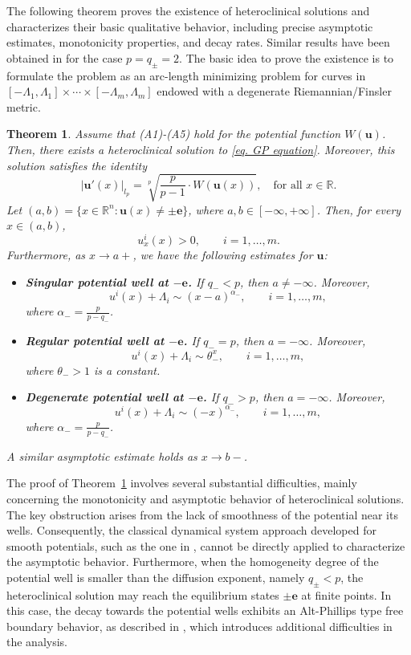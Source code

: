 \documentclass[11pt,twoside,reqno]{amsart}
\newtheorem{theorem}{Theorem}[section]
\numberwithin{equation}{section}
\begin{document}
The following theorem proves the existence of heteroclinical solutions and characterizes their basic qualitative behavior, including precise asymptotic estimates, monotonicity properties, and decay rates. Similar results have been obtained in \cite{AFN21,AftalionSourdis2019} for the case  $p=q_{\pm}=2$. The basic idea to prove the existence is to formulate the problem as an arc-length minimizing problem for curves in $[-\Lambda_{1},\Lambda_{1}]\times\cdots\times[-\Lambda_{m},\Lambda_{m}]$ endowed with a degenerate Riemannian/Finsler metric.
\begin{theorem}\label{thm. basic}
    Assume that (A1)-(A5) hold for the potential function $W(\mathbf{u})$. Then, there exists a heteroclinical solution to \eqref{eq. GP equation}. Moreover, this solution satisfies the identity
    \begin{equation}\label{eq. speed identity}
        |\mathbf{u}'(x)|_{l_{p}}=\sqrt[p]{\frac{p}{p-1}\cdot W(\mathbf{u}(x))},\quad\mbox{for all } x\in\mathbb{R}.
    \end{equation}
    Let $(a,b)=\{x\in\mathbb{R}^{n}:\mathbf{u}(x)\neq\pm\mathbf{e}\}$, where $a,b\in[-\infty,+\infty]$. 
    Then, for every $x\in(a,b)$,
    \[
    u_x^i(x)>0,\qquad i=1,\dots,m.
    \]
    Furthermore, as $x\to a+$, we have the following estimates for $\mathbf{u}$:
 \begin{itemize}
        \item \textbf{Singular potential well at $-\mathbf{e}$.}
        If $q_{-}<p$, then $a\neq-\infty$. Moreover,
        \[
        u^{i}(x)+\Lambda_i\sim (x-a)^{\alpha_-},\qquad i=1,\dots,m,
        \]
        where $\alpha_-=\frac{p}{p-q_-}$.
        \item \textbf{Regular potential well at $-\mathbf{e}$.}
        If $q_-=p$, then $a=-\infty$. Moreover,
        \[
        u^{i}(x)+\Lambda_i\sim \theta_-^{x},\qquad i=1,\dots,m,
        \]
        where $\theta_->1$ is a constant.
        \item \textbf{Degenerate potential well at $-\mathbf{e}$.}
        If $q_->p$, then $a=-\infty$. Moreover,
        \[
        u^{i}(x)+\Lambda_i\sim (-x)^{\alpha_-},\qquad i=1,\dots,m,
        \]
        where $\alpha_-=\frac{p}{p-q_-}$.
    \end{itemize}
    A similar asymptotic estimate holds as $x\to b-$.
\end{theorem}

The proof of Theorem~\ref{thm. basic} involves several substantial difficulties, mainly concerning the monotonicity and asymptotic behavior of heteroclinical solutions. The key obstruction arises from the lack of smoothness of the potential near its wells. Consequently, the classical dynamical system approach developed for smooth potentials, such as the one in \cite{AFN21}, cannot be directly applied to characterize the asymptotic behavior. Furthermore, when the homogeneity degree of the potential well is smaller than the diffusion exponent, namely $q_{\pm}<p$, the heteroclinical solution may reach the equilibrium states $\pm\mathbf{e}$ at finite points. In this case, the decay towards the potential wells exhibits an Alt-Phillips type free boundary behavior, as described in \cite{AP86}, which introduces additional difficulties in the analysis.
\end{document}
